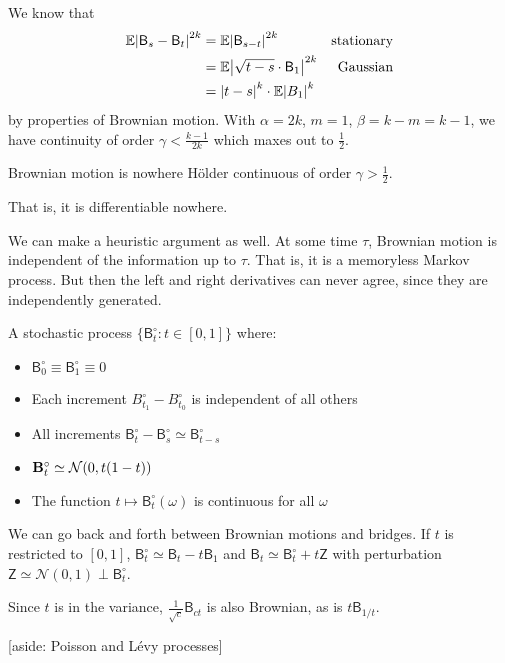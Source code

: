 \documentclass[notes]{agony}
\newcommand{\E}{\mathbb{E}}
\newcommand{\rv}{\mathsf}
\renewcommand{\N}{\mathcal{N}}
\newcommand{\ind}{\perp}
\begin{document}
We know that
\begin{align*}
	\E\abs{\rv B_s - \rv B_t}^{2k}
	 & = \E\abs{\rv B_{s-t}}^{2k}            & \text{stationary} \\
	 & = \E\abs{\sqrt{t-s}\cdot\rv B_1}^{2k} & \text{Gaussian}   \\
	 & = \abs{t-s}^k\cdot\E\abs{B_1}^k
\end{align*}
by properties of Brownian motion.
With $\alpha = 2k$, $m=1$, $\beta=k-m=k-1$,
we have continuity of order $\gamma < \frac{k-1}{2k}$
which maxes out to $\frac12$.

\begin{theorem}[Irregularity]
	Brownian motion is nowhere Hölder continuous of order $\gamma > \frac12$.
\end{theorem}

That is, it is differentiable nowhere.

We can make a heuristic argument as well.
At some time $\tau$, Brownian motion is independent of the information up to $\tau$.
That is, it is a memoryless Markov process.
But then the left and right derivatives can never agree,
since they are independently generated.

\begin{defn}
	A stochastic process $\{\rv B_t^\circ : t \in [0,1]\}$ where:
	\begin{itemize}[nosep]
		\item $\rv B_0^\circ \equiv \rv B_1^\circ \equiv 0$
		\item Each increment $B^\circ_{t_1} - B^\circ_{t_0}$ is independent of all others
		\item All increments $\rv B^\circ_t - \rv B^\circ_s \simeq \rv B^\circ_{t-s}$
		\item $\vb B^\circ_t \simeq \N(0,t(1-t))$
		\item The function $t \mapsto \rv B^\circ_t(\omega)$ is continuous for all $\omega$
	\end{itemize}
\end{defn}

We can go back and forth between Brownian motions and bridges.
If $t$ is restricted to $[0,1]$,
$\rv B_t^\circ \simeq \rv B_t - t\rv B_1$
and $\rv B_t \simeq \rv B_t^\circ + t\rv Z$
with perturbation $\rv Z \simeq \N(0,1) \ind \rv B_t^\circ$.

Since $t$ is in the variance, $\frac{1}{\sqrt{c}}\rv B_{ct}$
is also Brownian, as is $t\rv B_{1/t}$.

[aside: Poisson and Lévy processes]
\end{document}
